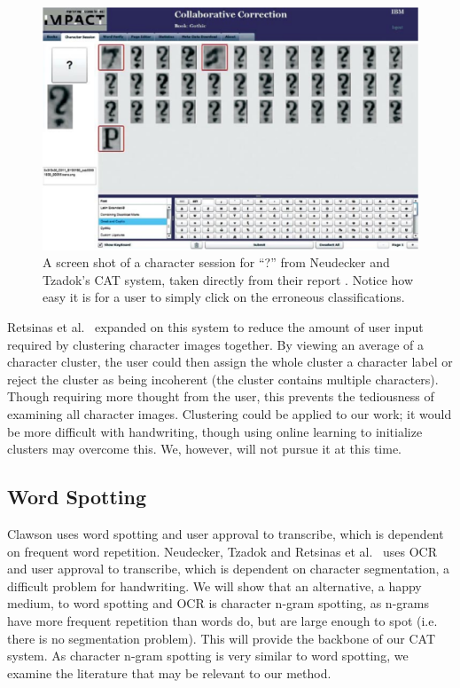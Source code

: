 \documentclass[ms]{byuprop}
\begin{document}
\begin{figure}
    \centering
    \includegraphics[width=.9\textwidth]{carpet}
    \caption{A screen shot of a character session for ``?'' from Neudecker and Tzadok's CAT system, taken directly from their report \cite{Neudecker2010}. Notice how easy it is for a user to simply click on the erroneous classifications.}
    \label{fig:carpet}
\end{figure}

Retsinas et al.~\cite{Retsinas2015} expanded on this system \cite{Neudecker2010} to reduce the amount of user input required by clustering character images together. By viewing an average of a character cluster, the user could then assign the whole cluster a character label or reject the cluster as being incoherent (the cluster contains multiple characters). Though requiring more thought from the user, this prevents the tediousness of examining all character images. Clustering could be applied to our work; it would be more difficult with handwriting, though using online learning to initialize clusters may overcome this. We, however, will not pursue it at this time.

\subsection{Word Spotting}

Clawson \cite{Clawson2014} uses word spotting and user approval to transcribe, which is dependent on frequent word repetition. Neudecker, Tzadok \cite{Neudecker2010} and Retsinas et al.~\cite{Retsinas2015} uses OCR and user approval to transcribe, which is dependent on character segmentation, a difficult problem for handwriting.
 We will show that an alternative, a happy medium, to word spotting and OCR is character n-gram spotting, as n-grams have more frequent repetition than words do, but are large enough to spot (i.e. there is no segmentation problem). This will provide the backbone of our CAT system. As character n-gram spotting is very similar to word spotting, we examine the literature that may be relevant to our method.
\end{document}
